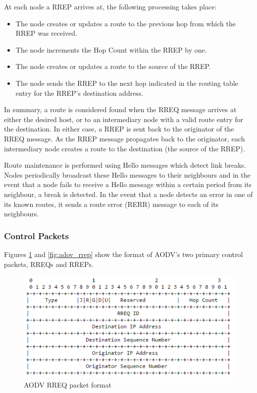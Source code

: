     At each node a RREP arrives at, the following processing takes place:
    \begin{itemize}
      \item The node creates or updates a route to the previous hop from which
      the RREP was received.
      \item The node increments the Hop Count within the RREP by one.
      \item The node creates or updates a route to the source of the RREP.
      \item The node sends the RREP to the next hop indicated in the routing
      table entry for the RREP's destination address.
    \end{itemize}

    In summary, a route is considered found when the RREQ message arrives at either the desired host,
    or to an intermediary node with a valid route entry for the destination.
    In either case, a RREP is sent back to the originator of
    the RREQ message. As the RREP message propagates back to the originator,
    each intermediary node creates a route to the destination (the source of the
    RREP).

    Route maintenance is performed using Hello messages which detect link breaks. Nodes periodically
    broadcast these Hello messages to their neighbours and in the event that a
    node fails to receive a Hello message within a certain period from its neighbour,
    a break is detected. In the event that a node detects an error in one of its known
    routes, it sends a route error (RERR) message to each of its neighbours.

        \subsubsection{Control Packets}
    Figures \ref{fig:adov_rreq} and \ref{fig:adov_rrep} show the format
    of AODV's two primary control packets, RREQs and RREPs.
    \FloatBarrier
    \begin{figure}[ht]
      \includegraphics[scale=0.75]{Images/chapter2/aodv_rreq.png}
      \caption{AODV RREQ packet format}
      \label{fig:adov_rreq}
    \end{figure}
    \FloatBarrier

